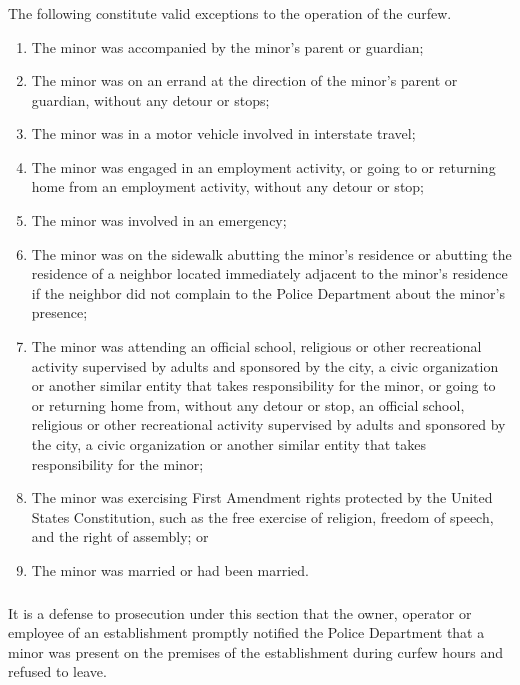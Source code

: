 \subsubsection{}
The following constitute valid exceptions to the operation of the curfew.
\begin{enumerate}[{\indent}a)]
    \item The minor was accompanied by the minor’s parent or guardian;
    \item The minor was on an errand at the direction of the minor’s parent or guardian, without any detour or stops;
    \item The minor was in a motor vehicle involved in interstate travel;
    \item The minor was engaged in an employment activity, or going to or returning home from an employment activity, without any detour or stop;
    \item The minor was involved in an emergency;
    \item The minor was on the sidewalk abutting the minor’s residence or abutting the residence of a neighbor located immediately adjacent to the minor’s residence if the neighbor did not complain to the Police Department about the minor’s presence;
    \item The minor was attending an official school, religious or other recreational activity supervised by adults and sponsored by the city, a civic organization or another similar entity that takes responsibility for the minor, or going to or returning home from, without any detour or stop, an official school, religious or other recreational activity supervised by adults and sponsored by the city, a civic organization or another similar entity that takes responsibility for the minor;
    \item The minor was exercising First Amendment rights protected by the United States Constitution, such as the free exercise of religion, freedom of speech, and the right of assembly; or
    \item The minor was married or had been married.
\end{enumerate}
\subsubsection{}
It is a defense to prosecution under this section that the owner, operator or employee of an establishment promptly notified the Police Department that a minor was present on the premises of the establishment during curfew hours and refused to leave.
